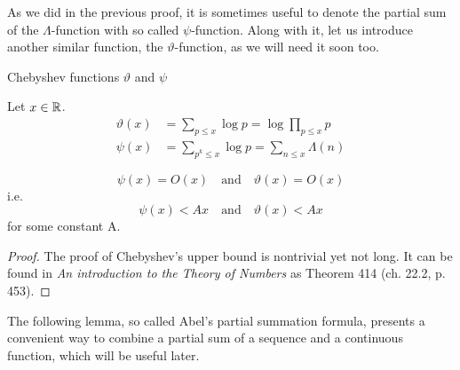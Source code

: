 \documentclass{article}
\begin{document}
As we did in the previous proof, it is sometimes useful to denote the partial sum of the $\Lambda$-function with so called $\psi$-function. Along with it, let us introduce another similar function, the $\vartheta$-function, as we will need it soon too.

\begin{definition}
Chebyshev functions $\vartheta$ and $\psi$

Let $x\in\mathbb{R}$.
\begin{align*}
     \vartheta(x) & = \sum_{p\leq x} \log p = \log \prod_{p\leq x} p\\
    \psi(x) & = \sum_{p^k\leq x} \log p = \sum_{n\leq x} \Lambda(n)
\end{align*}
\end{definition}

\begin{lemma}
\label{lemma:cheb}
\begin{equation*}
    \psi(x) = O(x) \quad\text{and}\quad \vartheta(x)=O(x)
\end{equation*}
i.e.
\begin{equation*}
    \psi(x) < Ax \quad\text{and}\quad \vartheta(x) < Ax
\end{equation*}
for some constant A.
\begin{proof}
The proof of Chebyshev's upper bound is nontrivial yet not long. It can be found in \textit{An introduction to the Theory of Numbers} \cite{HardyWright} as Theorem 414 (ch. 22.2, p. 453).
\end{proof}
\end{lemma}

The following lemma, so called Abel's partial summation formula, presents a convenient way to combine a partial sum of a sequence and a continuous function, which will be useful later.
\end{document}
